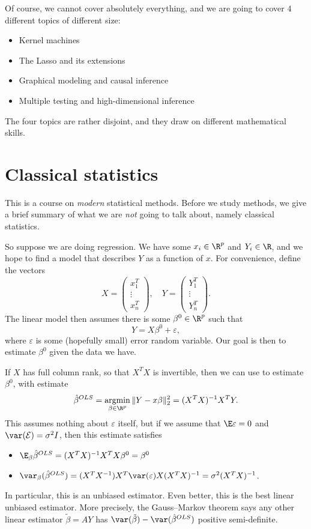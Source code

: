 \documentclass[a4paper]{article}
\DeclareMathOperator*\argmin{argmin}
\begin{document}
Of course, we cannot cover absolutely everything, and we are going to cover $4$ different topics of different size:
\begin{itemize}
  \item Kernel machines
  \item The Lasso and its extensions
  \item Graphical modeling and causal inference
  \item Multiple testing and high-dimensional inference
\end{itemize}
The four topics are rather disjoint, and they draw on different mathematical skills.

\section{Classical statistics}
This is a course on \emph{modern} statistical methods. Before we study methods, we give a brief summary of what we are \emph{not} going to talk about, namely classical statistics.

So suppose we are doing regression. We have some  $x_i \in \R^p$ and  $Y_i \in \R$, and we hope to find a model that describes $Y$ as a function of $x$. For convenience, define the vectors
\[
  X = \begin{pmatrix} x_1^T \\ \vdots \\ x_n^T\end{pmatrix},\quad
  Y = \begin{pmatrix} Y_1^T \\ \vdots \\ Y_n^T\end{pmatrix}.
\]
The linear model then assumes there is some $\beta^0 \in \R^p$ such that
\[
  Y = X \beta^0 + \varepsilon,
\]
where $\varepsilon$ is some (hopefully small) error random variable. Our goal is then to estimate $\beta^0$ given the data we have.

If $X$ has full column rank, so that $X^TX$ is invertible, then we can use  to estimate $\beta^0$, with estimate
\[
  \hat{\beta}^{OLS} = \argmin_{\beta \in \R^p} \|Y - x \beta\|_2^2 = (X^TX)^{-1} X^TY.
\]
This assumes nothing about $\varepsilon$ itself, but if we assume that $\E \varepsilon = 0$ and $\var (\mathcal{E}) = \sigma^2 I$, then this estimate satisfies
\begin{itemize}
  \item $\E_\beta \hat{\beta}^{OLS} = (X^T X)^{-1} X^T X \beta^0 = \beta^0$
  \item $\var_\beta(\hat{\beta}^{OLS}) = (X^T X^{-1}) X^T \var(\varepsilon) X (X^T X)^{-1} = \sigma^2 (X^T X)^{-1}$.
\end{itemize}
In particular, this is an unbiased estimator. Even better, this is the best linear unbiased estimator. More precisely, the Gauss--Markov theorem says any other linear estimator $\tilde{\beta} = AY$ has $\var(\tilde{\beta}) - \var(\hat{\beta}^{OLS})$ positive semi-definite.
\end{document}
